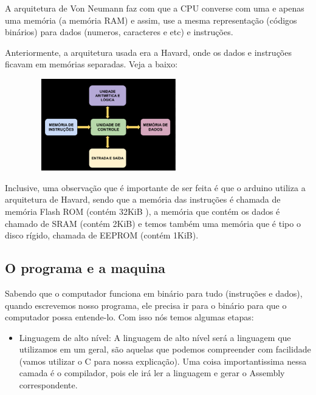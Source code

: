 \documentclass[12pt,a4paper]{report}
\begin{document}
	A arquitetura de Von Neumann faz com que a CPU converse com uma e apenas uma memória (a memória RAM) e assim, use a mesma representação (códigos binários) para dados (numeros, caracteres e etc) e instruções.
	
	Anteriormente, a arquitetura usada era a Havard, onde os dados e instruções ficavam em memórias separadas. Veja a baixo:
	
	\begin{center}
		
		\includegraphics[width=9cm,height=4cm,keepaspectratio=false]{imagens-teoria/havard.png}
		
	\end{center}
	
	Inclusive, uma observação que é importante de ser feita é que o arduino utiliza a arquitetura de Havard, sendo que a memória das instruções é chamada de memória Flash ROM (contém 32KiB ), a memória que contém os dados é chamado de SRAM (contém 2KiB) e temos também uma memória que é tipo o disco rígido, chamada de EEPROM (contém 1KiB).
	
	\subsection{O programa e a maquina}
	
	Sabendo que o computador funciona em binário para tudo (instruções e dados), quando escrevemos nosso programa, ele precisa ir para o binário para que o computador possa entende-lo. Com isso nós temos algumas etapas:
	
	\begin{itemize}
		
		\item Linguagem de alto nível: A linguagem de alto nível será a linguagem que utilizamos em um geral, são aquelas que podemos compreender com facilidade (vamos utilizar o C para nossa explicação). Uma coisa importantissima nessa camada é o compilador, pois ele irá ler a linguagem e gerar o Assembly correspondente.
	\end{itemize}
	
\end{document}
